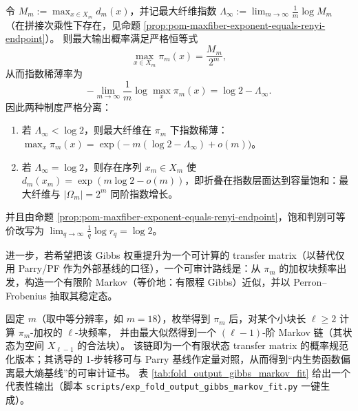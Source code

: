 \begin{proposition}\label{prop:pom-capacity-saturation-discriminant}
令 \(M_m:=\max_{x\in X_m}d_m(x)\)，并记最大纤维指数
\(
\Lambda_\infty:=\lim_{m\to\infty}\frac{1}{m}\log M_m
\)
（在拼接次乘性下存在，见命题 \ref{prop:pom-maxfiber-exponent-equals-renyi-endpoint}）。
则最大输出概率满足严格恒等式
\[
\max_{x\in X_m}\pi_m(x)=\frac{M_m}{2^m},
\]
从而指数稀薄率为
\[
-\lim_{m\to\infty}\frac{1}{m}\log\max_x\pi_m(x)=\log 2-\Lambda_\infty.
\]
因此两种制度严格分离：
\begin{enumerate}
  \item 若 \(\Lambda_\infty<\log 2\)，则最大纤维在 \(\pi_m\) 下指数稀薄：\(\max_x\pi_m(x)=\exp\!\bigl(-m(\log 2-\Lambda_\infty)+o(m)\bigr)\)。
  \item 若 \(\Lambda_\infty=\log 2\)，则存在序列 \(x_m\in X_m\) 使 \(d_m(x_m)=\exp(m\log 2-o(m))\)，即折叠在指数层面达到容量饱和：最大纤维与 \(|\Omega_m|=2^m\) 同阶指数增长。
\end{enumerate}
并且由命题 \ref{prop:pom-maxfiber-exponent-equals-renyi-endpoint}，饱和判别可等价改写为
\(
\lim_{q\to\infty}\frac{1}{q}\log r_q=\log 2
\)。
\end{proposition}

进一步，若希望把该 Gibbs 权重提升为一个可计算的 transfer matrix（以替代仅用 Parry/PF 作为外部基线的口径），一个可审计路线是：从 \(\pi_m\) 的加权块频率出发，构造一个有限阶 Markov（等价地：有限程 Gibbs）近似，并以 Perron--Frobenius 抽取其稳定态。

\begin{remark}\label{rem:pom-gibbs-markov-fit}
固定 \(m\)（取中等分辨率，如 \(m=18\)），枚举得到 \(\pi_m\) 后，对某个小块长 \(\ell\ge 2\) 计算 \(\pi_m\)-加权的 \(\ell\)-块频率，
并由最大似然得到一个 \((\ell-1)\)-阶 Markov 链（其状态为空间 \(X_{\ell-1}\) 的合法块）。
该链即为一个有限状态 transfer matrix 的概率规范化版本；其诱导的 1-步转移可与 Parry 基线作定量对照，从而得到“内生势函数偏离最大熵基线”的可审计证书。
表 \ref{tab:fold_output_gibbs_markov_fit} 给出一个代表性输出（脚本 \texttt{scripts/exp\_fold\_output\_gibbs\_markov\_fit.py} 一键生成）。
\end{remark}


